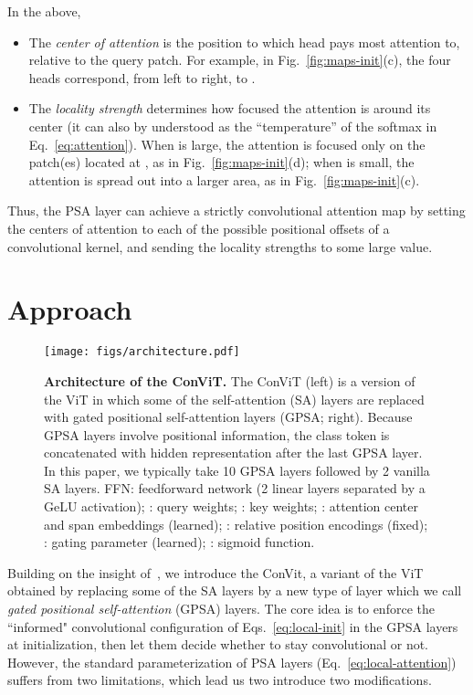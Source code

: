 In the above, 
\begin{itemize}
    \item The \emph{center of attention}  is the position to which head  pays most attention to, relative to the query patch. For example, in Fig.~\ref{fig:maps-init}(c), the four heads correspond, from left to right, to .
    \item The \emph{locality strength}  determines how focused the attention is around its center  (it can also by understood as the ``temperature'' of the softmax in Eq.~\ref{eq:attention}). When  is large, the attention is focused only on the patch(es) located at , as in Fig.~\ref{fig:maps-init}(d); when  is small, the attention is spread out into a larger area, as in Fig.~\ref{fig:maps-init}(c). 
\end{itemize} 

Thus, the PSA layer can achieve a strictly convolutional attention map by setting the centers of attention  to each of the possible positional offsets of a  convolutional kernel, and sending the locality strengths  to some large value. 


\section{Approach}

\begin{figure}[tb]
    \centering
    \texttt{[image: figs/architecture.pdf]}
    \caption{\textbf{Architecture of the ConViT.} The ConViT (left) is a version of the ViT in which some of the self-attention (SA) layers are replaced with gated positional self-attention layers (GPSA; right). Because GPSA layers involve positional information, the class token is concatenated with hidden representation after the last GPSA layer. In this paper, we typically take 10 GPSA layers followed by 2 vanilla SA layers. FFN: feedforward network (2 linear layers separated by a GeLU activation); : query weights; : key weights; : attention center and span embeddings (learned); : relative position encodings (fixed); : gating parameter (learned); : sigmoid function.}
    \label{fig:architecture}
\end{figure}

Building on the insight of~\cite{cordonnier2019relationship}, we introduce the ConVit, a variant of the ViT~\cite{dosovitskiy2020image} obtained by replacing some of the SA layers by a new type of layer which we call \emph{gated positional self-attention} (GPSA) layers. The core idea is to enforce the ``informed" convolutional configuration of Eqs.~\ref{eq:local-init} in the GPSA layers at initialization, then let them decide whether to stay convolutional or not. However, the standard parameterization of PSA layers (Eq.~\ref{eq:local-attention}) suffers from two limitations, which lead us two introduce two modifications.

